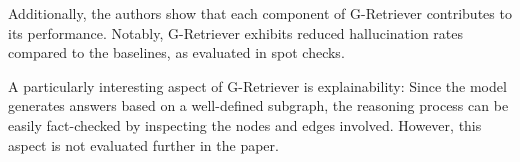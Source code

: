 Additionally, the authors show that each component of G-Retriever contributes to its performance.
Notably, G-Retriever exhibits reduced hallucination rates compared to the baselines, as evaluated in spot checks.

A particularly interesting aspect of G-Retriever is explainability: Since the model generates answers based on a well-defined subgraph, the reasoning process can be easily fact-checked by inspecting the nodes and edges involved.
However, this aspect is not evaluated further in the paper.